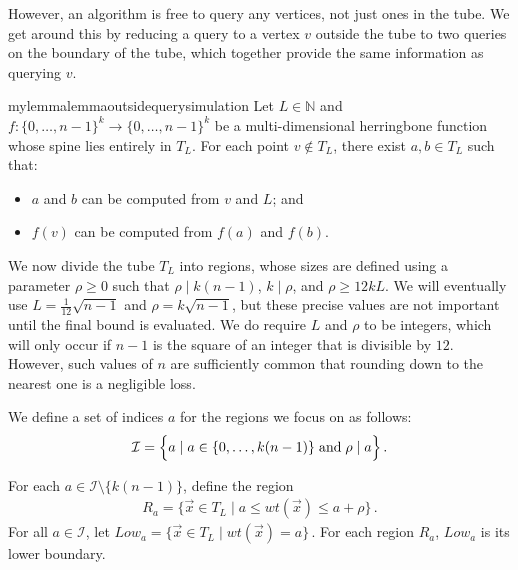 \documentclass[11pt]{article}
\begin{document}
However, an algorithm is free to query any vertices, not just ones in the tube. We get around this by reducing a query to a vertex $v$ outside the tube to two queries on the boundary of the tube, which together provide the same information as querying $v$.

\begin{restatable}{mylemma}{lemmaoutsidequerysimulation}
\label{lem:outside-query-simulation}
 Let $L \in \mathbb{N}$ and  $f: \{0, \ldots, n-1\}^k \to \{0, \ldots, n-1\}^k$  be a  multi-dimensional herringbone function whose spine lies entirely in $T_L$. 
    For each  point $v \not \in T_L$, there exist  $a, b \in T_L$ such that:
    \begin{itemize}
        \item $a$ and $b$ can be computed from $v$ and $L$; and
        \item $f(v)$ can be computed from $f(a)$ and $f(b)$.
    \end{itemize}
\end{restatable}


We now divide the tube $T_L$ into regions, whose  sizes are defined using a parameter $\rho  \geq 0$ such that $\rho \mid k(n-1)$, $ k \mid \rho$, and $\rho \geq 12kL$. We will eventually use $L = \frac{1}{12} \sqrt{n-1}$ and $\rho = k \sqrt{n-1}$, but these precise values are not important until the final bound is evaluated. We do require $L$ and $\rho$ to be integers, which will only occur if $n-1$ is the square of an integer that is divisible by $12$. However, such values of $n$ are sufficiently common that rounding down to the nearest one is a negligible loss.

We define a set of indices $a$ for the regions we focus on as follows:
\begin{align}
    \mathcal{I} =  \Bigl\{a \mid a \in \{0, \ldots, k(n-1)\} \; \mbox{and} \; \rho \mid a \Bigr\}\,.
\end{align}

\begin{definition}[Regions]
For each $a \in \mathcal{I} \setminus \{k(n-1)\}$, define the region 
\begin{align}
    R_a = \{ \vec{x} \in T_L \mid  a \leq wt(\vec{x}) \leq a + \rho \}\,. \label{eq:region_R_a}
\end{align}
For all $a \in \mathcal{I}$, let 
    $Low_a = \{ \vec{x} \in T_L \mid wt(\vec{x}) = a\}\,.$
For each region $R_a$, $Low_a$ is its lower boundary.
\end{definition}
\end{document}
